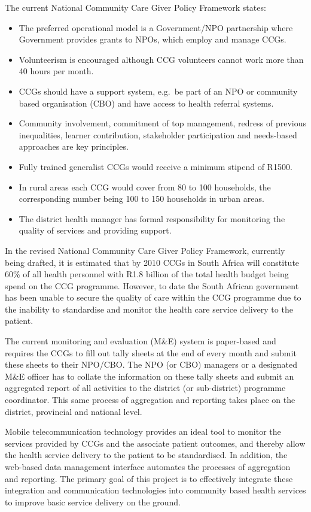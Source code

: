 The current National Community Care Giver Policy Framework 
states:
\begin{itemize}
\item The preferred operational model is a Government/NPO partnership 
where Government provides grants to NPOs, which employ and manage CCGs.
\item Volunteerism is encouraged although CCG volunteers cannot work 
more than 40 hours per month.
\item CCGs should have a support system, e.g.~be part of an NPO or community 
based organisation (CBO) and have access to health referral systems.
\item Community involvement, commitment of top management, redress of 
previous inequalities, learner contribution, stakeholder participation and 
needs-based approaches are key principles.
\item Fully trained generalist CCGs would receive a minimum stipend of R1500.
\item In rural areas each CCG would cover from 80 to 100 households, the 
corresponding number being 100 to 150 households in urban areas.
\item The district health manager has formal responsibility for monitoring 
the quality of services and providing support.
\end{itemize} 

In the revised National Community Care Giver Policy Framework, currently being 
drafted, it is estimated that by 2010 CCGs in South Africa will constitute
60\% of all health personnel with R1.8 billion of the total health budget 
being spend on the CCG programme. However, to date the South 
African government has been unable to secure the quality 
of care within the CCG programme due to the inability to standardise and monitor 
the health care service delivery to the patient. 

The current monitoring 
and evaluation (M\&E) system is paper-based and requires the CCGs to 
fill out tally sheets at the end of every month and submit these sheets 
to their NPO/CBO. The NPO (or CBO) managers or a designated M\&E officer 
has to collate the information on these tally sheets and submit an 
aggregated report of all activities to the district (or sub-district) 
programme coordinator. This same process of aggregation and reporting 
takes place on the district, provincial and national level. 

Mobile telecommunication 
technology provides an ideal tool to monitor the services provided by CCGs 
and the associate patient outcomes, and thereby allow the health service 
delivery to the patient to be standardised. In addition, the web-based 
data management interface automates the processes of aggregation 
and reporting. The primary goal of this project is to effectively 
integrate these integration and communication technologies into 
community based health services to improve basic service delivery 
on the ground.


